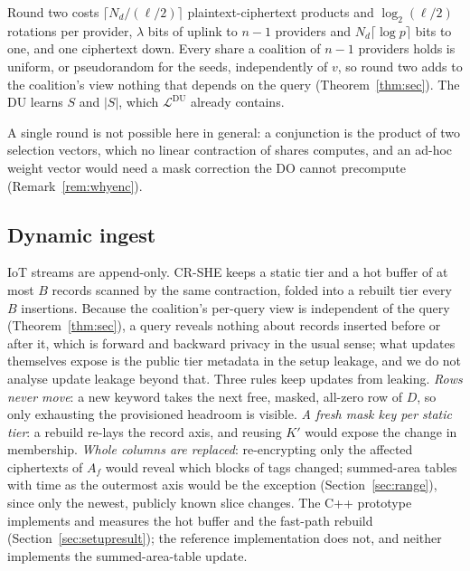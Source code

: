 \documentclass[a4paper,fleqn]{cas-sc}
\newcommand{\Leak}{\mathcal{L}}
\begin{document}
Round two costs $\lceil N_d/(\ell/2)\rceil$ plaintext-ciphertext products and
$\log_2(\ell/2)$ rotations per provider, $\lambda$ bits of uplink to $n-1$
providers and $N_d\lceil\log p\rceil$ bits to one, and one ciphertext down.
Every share a coalition of $n-1$ providers holds is uniform, or pseudorandom
for the seeds, independently of $v$, so round two adds to the coalition's view
nothing that depends on the query (Theorem~\ref{thm:sec}). The DU learns $S$
and $|S|$, which $\Leak^{\text{DU}}$ already contains.

A single round is not possible here in general: a conjunction is the product
of two selection vectors, which no linear contraction of shares computes, and
an ad-hoc weight vector would need a mask correction the DO cannot precompute
(Remark~\ref{rem:whyenc}).

\subsection{Dynamic ingest}
\label{sec:ingest}
IoT streams are append-only. CR-SHE keeps a static tier and a hot buffer of at
most $B$ records scanned by the same contraction, folded into a rebuilt tier
every $B$ insertions. Because the coalition's per-query view is independent of
the query (Theorem~\ref{thm:sec}), a query reveals nothing about records
inserted before or after it, which is forward and backward privacy in the usual
sense; what updates themselves expose is the public tier metadata in the setup
leakage, and we do not analyse update leakage beyond that.
Three rules keep updates from leaking. \emph{Rows never move}: a new keyword
takes the next free, masked, all-zero row of $D$, so only exhausting the
provisioned headroom is visible. \emph{A fresh mask key per static tier}: a
rebuild re-lays the record axis, and reusing $K'$ would expose the change in
membership. \emph{Whole columns are replaced}: re-encrypting only the affected
ciphertexts of $A_f$ would reveal which blocks of tags changed; summed-area
tables with time as the outermost axis would be the exception
(Section~\ref{sec:range}), since only the newest, publicly known slice changes.
The C++ prototype implements and measures the hot buffer and the fast-path
rebuild (Section~\ref{sec:setupresult}); the reference implementation does
not, and neither implements the summed-area-table update.
\end{document}
